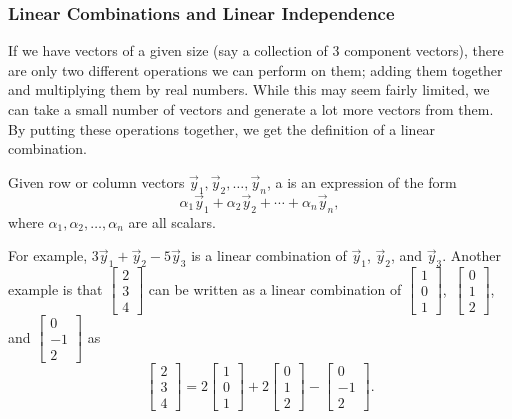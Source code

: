 \subsubsection{Linear Combinations and Linear Independence}

If we have vectors of a given size (say a collection of 3 component vectors), there are only two different operations we can perform on them; adding them together and multiplying them by real numbers. While this may seem fairly limited, we can take a small number of vectors and generate a lot more vectors from them. By putting these operations together, we get the definition of a linear combination. 

\begin{definition}
Given row or column vectors $\vec{y}_1, \vec{y}_2, \ldots, \vec{y}_n$,
a \emph{} is an expression of the form
\begin{equation*}
\alpha_1 \vec{y}_1 + 
\alpha_2 \vec{y}_2 + 
\cdots +
\alpha_n \vec{y}_n ,
\end{equation*}
where $\alpha_1, \alpha_2, \ldots, \alpha_n$ are all scalars.
\end{definition}%
For example,
$3 \vec{y}_1 + \vec{y}_2 - 5 \vec{y}_3$ is a linear combination
of $\vec{y}_1$, $\vec{y}_2$, and $\vec{y}_3$. Another example is that $\left[\begin{smallmatrix} 2 \\ 3 \\ 4 \end{smallmatrix} \right]$ can be written as a linear combination of $\left[\begin{smallmatrix} 1 \\ 0 \\ 1 \end{smallmatrix}\right]$,\ $\left[\begin{smallmatrix} 0 \\ 1 \\ 2 \end{smallmatrix}\right]$, and $\left[\begin{smallmatrix}  0 \\ -1 \\ 2 \end{smallmatrix}\right]$ as 
\begin{equation*}
 \begin{bmatrix} 2 \\ 3 \\ 4 \end{bmatrix} = 2\begin{bmatrix}  1 \\ 0 \\ 1 \end{bmatrix} + 2 \begin{bmatrix} 0 \\ 1 \\ 2  \end{bmatrix} - \begin{bmatrix} 0 \\ -1 \\ 2 \end{bmatrix}.
 \end{equation*}

